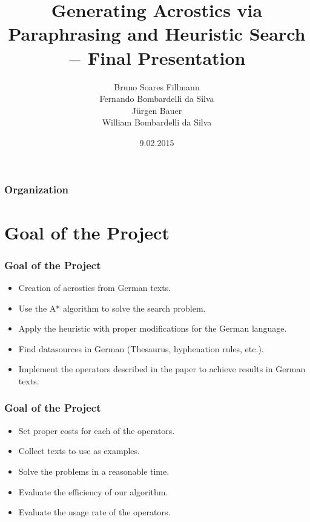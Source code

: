 \documentclass{beamer}
\title[Generating Acrostics via Paraphrasing and Heuristic Search]{Generating Acrostics via Paraphrasing and Heuristic Search $-$ Final Presentation} %
\author[Bruno, Fernando, Jürgen, William]{Bruno Soares Fillmann\\
Fernando Bombardelli da Silva\\
Jürgen Bauer\\
William Bombardelli da Silva
} %
\institute[TU Berlin] %
{
Technische Universität Berlin \\ %
Datenbanksysteme und Informationsmanagement \\
DBPRO – Database Projects (WS 2014/2015) \\
\medskip
}
\date{9.02.2015} %
\begin{document}
\begin{frame}
\titlepage %
\end{frame}

\begin{frame}
\frametitle{Organization} %
\tableofcontents %
\end{frame}


\section{Goal of the Project} %

\begin{frame}
\frametitle{Goal of the Project}
\begin{itemize}
	\item Creation of acrostics from German texts.
	\item Use the A* algorithm to solve the search problem.
	\item Apply the heuristic with proper modifications for the German language.
	\item Find datasources in German (Thesaurus, hyphenation rules, etc.).
	\item Implement the operators described in the paper to achieve results in German texts.
\end{itemize}
\end{frame}

\begin{frame}
\frametitle{Goal of the Project}
\begin{itemize}
	\item Set proper costs for each of the operators.
	\item Collect texts to use as examples.
	\item Solve the problems in a reasonable time.
	\item Evaluate the efficiency of our algorithm.
	\item Evaluate the usage rate of the operators.
\end{itemize}
\end{frame}
\end{document}
